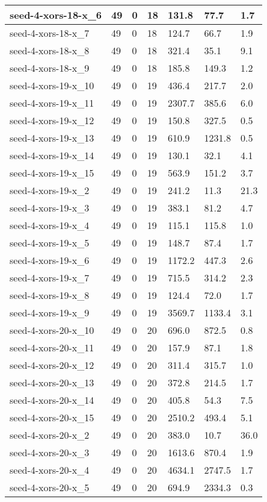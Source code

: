 \begin{scriptsize}
\begin{longtable}{|p{5cm}|l|l|l|l|l|l|}
seed-4-xors-18-x\_6&49&0&18&131.8&77.7&1.7 \\ \hline 
seed-4-xors-18-x\_7&49&0&18&124.7&66.7&1.9 \\ \hline 
seed-4-xors-18-x\_8&49&0&18&321.4&35.1&9.1 \\ \hline 
seed-4-xors-18-x\_9&49&0&18&185.8&149.3&1.2 \\ \hline 
seed-4-xors-19-x\_10&49&0&19&436.4&217.7&2.0 \\ \hline 
seed-4-xors-19-x\_11&49&0&19&2307.7&385.6&6.0 \\ \hline 
seed-4-xors-19-x\_12&49&0&19&150.8&327.5&0.5 \\ \hline 
seed-4-xors-19-x\_13&49&0&19&610.9&1231.8&0.5 \\ \hline 
seed-4-xors-19-x\_14&49&0&19&130.1&32.1&4.1 \\ \hline 
seed-4-xors-19-x\_15&49&0&19&563.9&151.2&3.7 \\ \hline 
seed-4-xors-19-x\_2&49&0&19&241.2&11.3&21.3 \\ \hline 
seed-4-xors-19-x\_3&49&0&19&383.1&81.2&4.7 \\ \hline 
seed-4-xors-19-x\_4&49&0&19&115.1&115.8&1.0 \\ \hline 
seed-4-xors-19-x\_5&49&0&19&148.7&87.4&1.7 \\ \hline 
seed-4-xors-19-x\_6&49&0&19&1172.2&447.3&2.6 \\ \hline 
seed-4-xors-19-x\_7&49&0&19&715.5&314.2&2.3 \\ \hline 
seed-4-xors-19-x\_8&49&0&19&124.4&72.0&1.7 \\ \hline 
seed-4-xors-19-x\_9&49&0&19&3569.7&1133.4&3.1 \\ \hline 
seed-4-xors-20-x\_10&49&0&20&696.0&872.5&0.8 \\ \hline 
seed-4-xors-20-x\_11&49&0&20&157.9&87.1&1.8 \\ \hline 
seed-4-xors-20-x\_12&49&0&20&311.4&315.7&1.0 \\ \hline 
seed-4-xors-20-x\_13&49&0&20&372.8&214.5&1.7 \\ \hline 
seed-4-xors-20-x\_14&49&0&20&405.8&54.3&7.5 \\ \hline 
seed-4-xors-20-x\_15&49&0&20&2510.2&493.4&5.1 \\ \hline 
seed-4-xors-20-x\_2&49&0&20&383.0&10.7&36.0 \\ \hline 
seed-4-xors-20-x\_3&49&0&20&1613.6&870.4&1.9 \\ \hline 
seed-4-xors-20-x\_4&49&0&20&4634.1&2747.5&1.7 \\ \hline 
seed-4-xors-20-x\_5&49&0&20&694.9&2334.3&0.3 \\ \hline 

\end{longtable}
\end{scriptsize}
